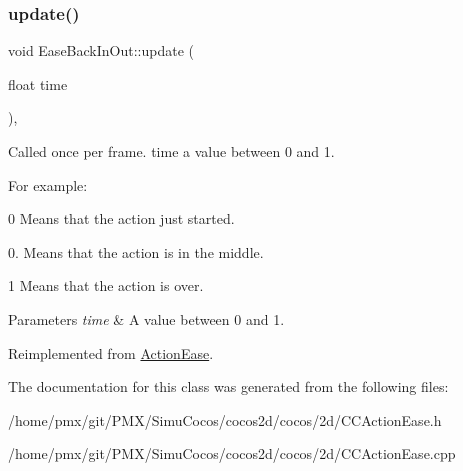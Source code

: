 \mbox{\label{classEaseBackInOut_ae26d3104da166cedfd16ea1915069a4a}} 
\subsubsection{\texorpdfstring{update()}{update()}}
{\footnotesize\ttfamily void Ease\+Back\+In\+Out\+::update (\begin{DoxyParamCaption}\item[{float}]{time }\end{DoxyParamCaption})\hspace{0.3cm}{\ttfamily [override]}, {\ttfamily [virtual]}}

Called once per frame. time a value between 0 and 1.

For example\+:
\begin{DoxyItemize}
\item 0 Means that the action just started.
\item 0. Means that the action is in the middle.
\item 1 Means that the action is over.
\end{DoxyItemize}


\begin{DoxyParams}{Parameters}
{\em time} & A value between 0 and 1. \\
\hline
\end{DoxyParams}


Reimplemented from \hyperlink{classActionEase_a77679f09c02cf75fb54776470c339fc5}{Action\+Ease}.



The documentation for this class was generated from the following files\+:\begin{DoxyCompactItemize}
\item 
/home/pmx/git/\+P\+M\+X/\+Simu\+Cocos/cocos2d/cocos/2d/C\+C\+Action\+Ease.\+h\item 
/home/pmx/git/\+P\+M\+X/\+Simu\+Cocos/cocos2d/cocos/2d/C\+C\+Action\+Ease.\+cpp\end{DoxyCompactItemize}
